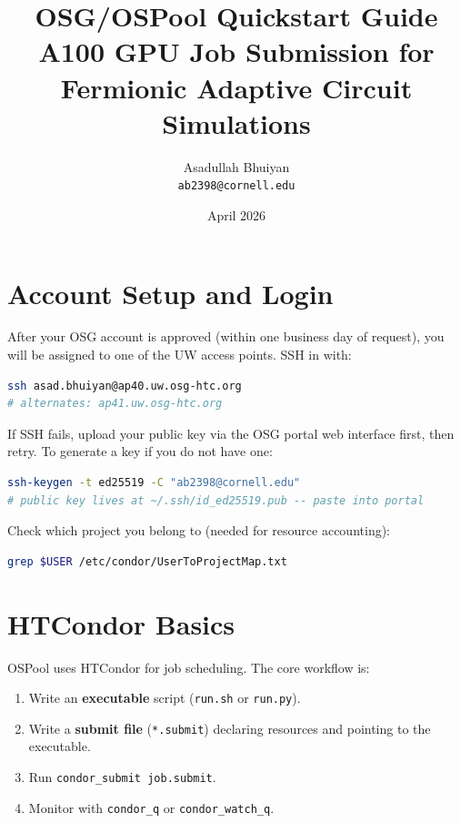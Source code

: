 \documentclass[11pt]{article}
\title{\textbf{OSG/OSPool Quickstart Guide}\\
\large A100 GPU Job Submission for Fermionic Adaptive Circuit Simulations}
\author{Asadullah Bhuiyan \\ \small\texttt{ab2398@cornell.edu}}
\date{April 2026}
\begin{document}
\maketitle
\tableofcontents
\newpage

\section{Account Setup and Login}

After your OSG account is approved (within one business day of request), you
will be assigned to one of the UW access points. SSH in with:

\begin{lstlisting}[language=bash]
ssh asad.bhuiyan@ap40.uw.osg-htc.org
# alternates: ap41.uw.osg-htc.org
\end{lstlisting}

If SSH fails, upload your public key via the OSG portal web interface first,
then retry. To generate a key if you do not have one:

\begin{lstlisting}[language=bash]
ssh-keygen -t ed25519 -C "ab2398@cornell.edu"
# public key lives at ~/.ssh/id_ed25519.pub -- paste into portal
\end{lstlisting}

Check which project you belong to (needed for resource accounting):
\begin{lstlisting}[language=bash]
grep $USER /etc/condor/UserToProjectMap.txt
\end{lstlisting}

\section{HTCondor Basics}

OSPool uses HTCondor for job scheduling. The core workflow is:

\begin{enumerate}[leftmargin=*]
    \item Write an \textbf{executable} script (\texttt{run.sh} or \texttt{run.py}).
    \item Write a \textbf{submit file} (\texttt{*.submit}) declaring resources and
          pointing to the executable.
    \item Run \texttt{condor\_submit job.submit}.
    \item Monitor with \texttt{condor\_q} or \texttt{condor\_watch\_q}.
\end{enumerate}
\end{document}
